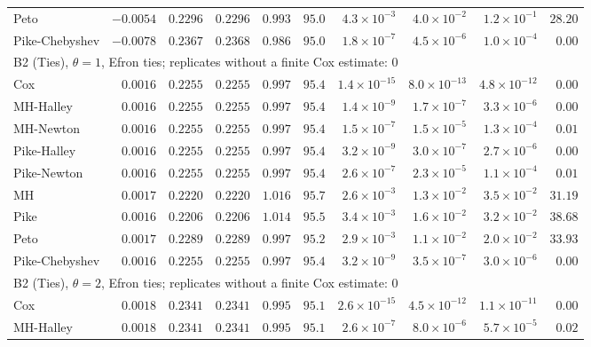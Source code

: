 \begin{landscape}
\begin{longtable}{lrrrrrrrrr}
Peto & $-0.0054$ & $0.2296$ & $0.2296$ & $0.993$ & $95.0$ & $4.3 \times 10^{-3}$ & $4.0 \times 10^{-2}$ & $1.2 \times 10^{-1}$ & $28.20$ \\
Pike-Chebyshev & $-0.0078$ & $0.2367$ & $0.2368$ & $0.986$ & $95.0$ & $1.8 \times 10^{-7}$ & $4.5 \times 10^{-6}$ & $1.0 \times 10^{-4}$ & $0.00$ \\
\multicolumn{10}{l}{B2 (Ties), $\theta = 1$, Efron ties; replicates without a finite Cox estimate: 0} \\
Cox & $0.0016$ & $0.2255$ & $0.2255$ & $0.997$ & $95.4$ & $1.4 \times 10^{-15}$ & $8.0 \times 10^{-13}$ & $4.8 \times 10^{-12}$ & $0.00$ \\
MH-Halley & $0.0016$ & $0.2255$ & $0.2255$ & $0.997$ & $95.4$ & $1.4 \times 10^{-9}$ & $1.7 \times 10^{-7}$ & $3.3 \times 10^{-6}$ & $0.00$ \\
MH-Newton & $0.0016$ & $0.2255$ & $0.2255$ & $0.997$ & $95.4$ & $1.5 \times 10^{-7}$ & $1.5 \times 10^{-5}$ & $1.3 \times 10^{-4}$ & $0.01$ \\
Pike-Halley & $0.0016$ & $0.2255$ & $0.2255$ & $0.997$ & $95.4$ & $3.2 \times 10^{-9}$ & $3.0 \times 10^{-7}$ & $2.7 \times 10^{-6}$ & $0.00$ \\
Pike-Newton & $0.0016$ & $0.2255$ & $0.2255$ & $0.997$ & $95.4$ & $2.6 \times 10^{-7}$ & $2.3 \times 10^{-5}$ & $1.1 \times 10^{-4}$ & $0.01$ \\
MH & $0.0017$ & $0.2220$ & $0.2220$ & $1.016$ & $95.7$ & $2.6 \times 10^{-3}$ & $1.3 \times 10^{-2}$ & $3.5 \times 10^{-2}$ & $31.19$ \\
Pike & $0.0016$ & $0.2206$ & $0.2206$ & $1.014$ & $95.5$ & $3.4 \times 10^{-3}$ & $1.6 \times 10^{-2}$ & $3.2 \times 10^{-2}$ & $38.68$ \\
Peto & $0.0017$ & $0.2289$ & $0.2289$ & $0.997$ & $95.2$ & $2.9 \times 10^{-3}$ & $1.1 \times 10^{-2}$ & $2.0 \times 10^{-2}$ & $33.93$ \\
Pike-Chebyshev & $0.0016$ & $0.2255$ & $0.2255$ & $0.997$ & $95.4$ & $3.2 \times 10^{-9}$ & $3.5 \times 10^{-7}$ & $3.0 \times 10^{-6}$ & $0.00$ \\
\multicolumn{10}{l}{B2 (Ties), $\theta = 2$, Efron ties; replicates without a finite Cox estimate: 0} \\
Cox & $0.0018$ & $0.2341$ & $0.2341$ & $0.995$ & $95.1$ & $2.6 \times 10^{-15}$ & $4.5 \times 10^{-12}$ & $1.1 \times 10^{-11}$ & $0.00$ \\
MH-Halley & $0.0018$ & $0.2341$ & $0.2341$ & $0.995$ & $95.1$ & $2.6 \times 10^{-7}$ & $8.0 \times 10^{-6}$ & $5.7 \times 10^{-5}$ & $0.02$ \\

\end{longtable}
\end{landscape}
